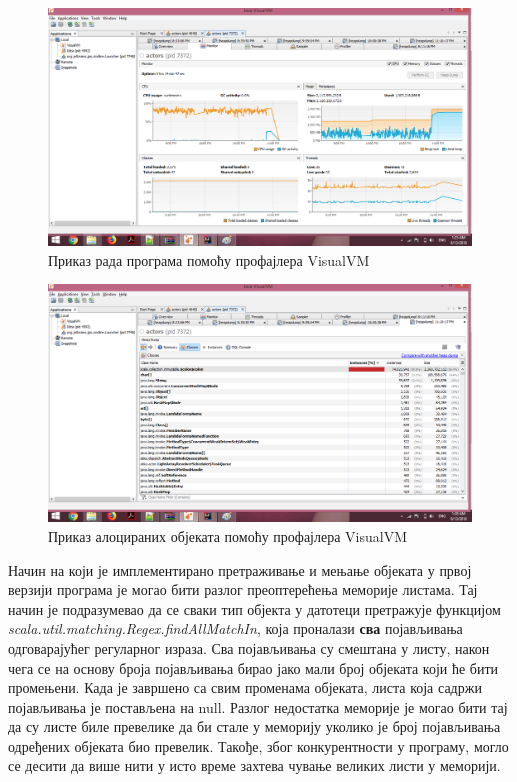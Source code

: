\documentclass[12pt,oneside]{memoir}
\begin{document}
\begin{figure}[t!]
\centering
\includegraphics[width=1\textwidth]{10_Workera_1000ms.png}
\caption{Приказ рада програма помоћу профајлера VisualVM}
\label{fig:monitor}
\end{figure}

\begin{figure}[t!]
\centering
\includegraphics[width=1\textwidth]{10_Workera_1000ms_HD6.png}
\caption{Приказ алоцираних објеката помоћу профајлера VisualVM}
\label{fig:HD}
\end{figure}

Начин на који је имплементирано претраживање и мењање објеката у првој верзији програма је могао бити разлог преоптерећења меморије листама. Тај начин је подразумевао да се сваки тип објекта у датотеци претражује функцијом \textit{scala.util.matching.Regex.findAllMatchIn}, која проналази \textbf{сва} појављивања одговарајућег регуларног израза. Сва појављивања су смештана у листу, након чега се на основу броја појављивања бирао јако мали број објеката који ће бити промењени. Када је завршено са свим променама објеката, листа која садржи појављивања је постављена на null. Разлог недостатка меморије је могао бити тај да су листе биле превелике да би стале у меморију уколико је број појављивања одређених објеката био превелик. Такође, због конкурентности у програму, могло се десити да више нити у исто време захтева чување великих листи у меморији. 
\end{document}
